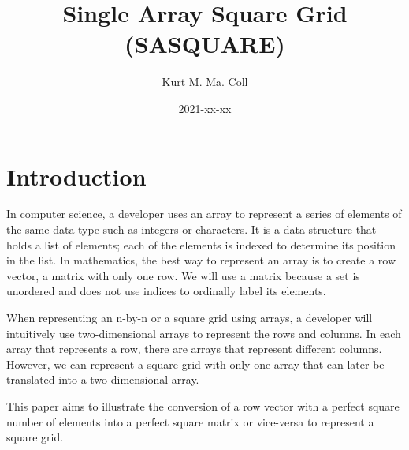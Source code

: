 \documentclass[letterpaper, twoside,12pt]{article}
\title{Single Array Square Grid (SASQUARE)}
\date{2021-xx-xx}
\author{Kurt M. Ma. Coll}
\begin{document}

    \maketitle
    \newpage

    \tableofcontents
    \newpage

    \section*{Introduction}
    In computer science, a developer uses an array to represent a series of elements of the same data type such as integers or characters. It is a data structure that holds a list of elements; each of the elements is indexed to determine its position in the list. In mathematics, the best way to represent an array is to create a row vector, a matrix with only one row. We will use a matrix because a set is unordered and does not use indices to ordinally label its elements.

    When representing an n-by-n or a square grid using arrays, a developer will intuitively use two-dimensional arrays to represent the rows and columns. In each array that represents a row, there are arrays that represent different columns. However, we can represent a square grid with only one array that can later be translated into a two-dimensional array.

    This paper aims to illustrate the conversion of a row vector with a perfect square number of elements into a perfect square matrix or vice-versa to represent a square grid.

    \newpage
\end{document}

